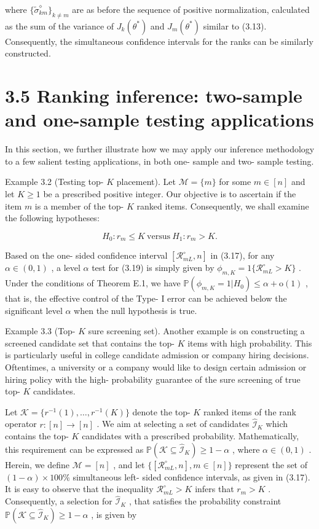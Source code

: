 where \(\{\widetilde{\sigma}_{km}^{\diamond}\}_{k \neq m}\) are as
before the sequence of positive normalization, calculated as the sum of
the variance of \(J_{k}(\theta^{*})\) and \(J_{m}(\theta^{*})\) similar
to (3.13). Consequently, the simultaneous confidence intervals for the
ranks can be similarly constructed.

\section{3.5 Ranking inference: two-sample and one-sample testing
applications}\label{ranking-inference-two-sample-and-one-sample-testing-applications}

In this section, we further illustrate how we may apply our inference
methodology to a few salient testing applications, in both one- sample
and two- sample testing.

Example 3.2 (Testing top- \(K\) placement). Let \(\mathcal{M} = \{m\}\)
for some \(m \in [n]\) and let \(K \geq 1\) be a prescribed positive
integer. Our objective is to ascertain if the item \(m\) is a member of
the top- \(K\) ranked items. Consequently, we shall examine the
following hypotheses:

\[
H_{0}:r_{m}\leq K\mathrm{~versus~}H_{1}:r_{m} > K. \tag{3.19}
\]

Based on the one- sided confidence interval
\([\mathcal{R}_{mL}^{\circ}, n]\) in (3.17), for any
\(\alpha \in (0,1)\) , a level \(\alpha\) test for (3.19) is simply
given by \(\phi_{m,K} = 1\{\mathcal{R}_{mL}^{\circ} > K\}\) . Under the
conditions of Theorem E.1, we have
\(\mathbb{P}(\phi_{m,K} = 1|H_{0}) \leq \alpha + \mathrm{o}(1)\) , that
is, the effective control of the Type- I error can be achieved below the
significant level \(\alpha\) when the null hypothesis is true.

Example 3.3 (Top- \(K\) sure screening set). Another example is on
constructing a screened candidate set that contains the top- \(K\) items
with high probability. This is particularly useful in college candidate
admission or company hiring decisions. Oftentimes, a university or a
company would like to design certain admission or hiring policy with the
high- probability guarantee of the sure screening of true top- \(K\)
candidates.

Let \(\mathcal{K} = \{r^{- 1}(1),\ldots ,r^{- 1}(K)\}\) denote the top-
\(K\) ranked items of the rank operator \(r:[n]\to [n]\) . We aim at
selecting a set of candidates \(\widehat{\mathcal{I}}_K\) which contains
the top- \(K\) candidates with a prescribed probability. Mathematically,
this requirement can be expressed as
\(\mathbb{P}(\mathcal{K}\subseteq \widehat{\mathcal{I}}_K)\geq 1 - \alpha\)
, where \(\alpha \in (0,1)\) . Herein, we define \(\mathcal{M} = [n]\) ,
and let \(\{[\mathcal{R}_{mL}^{\circ},n],m\in [n]\}\) represent the set
of \((1 - \alpha)\times 100\%\) simultaneous left- sided confidence
intervals, as given in (3.17). It is easy to observe that the inequality
\(\mathcal{R}_{mL}^{\circ} > K\) infers that \(r_m > K\) . Consequently,
a selection for \(\widehat{\mathcal{I}}_K\) , that satisfies the
probability constraint
\(\mathbb{P}(\mathcal{K}\subseteq \widehat{\mathcal{I}}_K)\geq 1 - \alpha\)
, is given by

